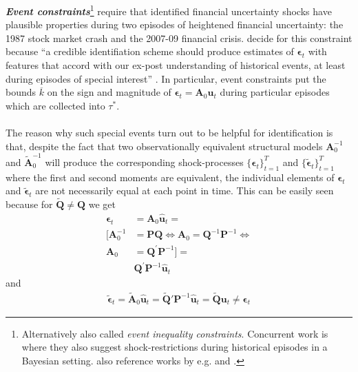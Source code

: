 \documentclass[a4paper,11pt,listof=nochaptergap,oneside,pointednumbers,bibtotoc,bigheadings,liststotoc,hidelinks]{scrbook}
\theoremstyle{mysatz}
\theoremstyle{mydefinition}
\theoremstyle{mytheorem}
\theoremstyle{mybemerkung}
\let\oldhat\hat
\newcommand{\vect}[1]{\boldsymbol{\mathbf{#1}}}
\newcommand{\hatt}[1]{\oldhat{\boldsymbol{\mathbf{#1}}}}
\begin{document}
\textbf{\textit{Event constraints}}\footnote{Alternatively also called \textit{event inequality constraints}. Concurrent work is \citet{diazramirez:18} where they also suggest shock-restrictions during historical episodes in a Bayesian setting. \citet{ludvigsonetal:17} also reference works by e.g. \citet{cieslakschrimpf:19} and \citet{zeev:18}.} require that identified financial uncertainty shocks have plausible properties during two episodes of heightened financial uncertainty: the 1987 stock market crash and the 2007-09 financial crisis. \citet{ludvigsonetal:18} decide for this constraint because ``a credible identifiation scheme should produce estimates of $\vect{\epsilon}_t$ with features that accord with our ex-post understanding of historical events, at least during episodes of special interest'' \citep[p. 7]{ludvigsonetal:18}.  In particular, event constraints put the bounds $\overline{k}$ on the sign and magnitude of $\vect{\epsilon}_t = \vect{A}_0\vect{u}_t$ during particular episodes which are collected into $\tau^*$. \\
\\
The reason why such special events turn out to be helpful for identification is that, despite the fact that two observationally equivalent structural models $\vect{A}_0^{-1}$ and $\widetilde{\vect{A}}_0^{-1}$ will produce the corresponding shock-processes $\big\{\vect{\epsilon}_t\big\}_{t=1}^T$ and $\big\{\widetilde{\vect{\epsilon}}_t\big\}_{t=1}^T$ where the first and second moments are equivalent, the individual elements of $\vect{\epsilon}_t$ and $\widetilde{\vect{\epsilon}}_t$ are not necessarily equal at each point in time. This can be easily seen because for $\widetilde{\vect{Q}} \neq \vect{Q}$ we get 
\begin{equation} \label{eq:svar_ludvi9}
\begin{split}
\vect{\epsilon}_t & = \vect{A}_0\hatt{\vect{u}}_t = \\
[\vect{A}_0^{-1} & = \vect{P}\vect{Q} \iff \vect{A}_0 = \vect{Q}^{-1}\vect{P}^{-1} \iff \\
\vect{A}_0 & = \vect{Q}^{'}\vect{P}^{-1}] = \\
	& \vect{Q}^'\vect{P}^{-1}\hatt{\vect{u}}_t 
\end{split}								
\end{equation}
and 
\begin{equation} \label{eq:svar_ludvi10}
\begin{split}
\widetilde{\vect{\epsilon}}_t = \widetilde{\vect{A}}_0\hatt{\vect{u}}_t = \widetilde{\vect{Q}}'\vect{P}^{-1}\hatt{\vect{u}}_t = \widetilde{\vect{Q}}\vect{u}_t \neq \vect{\epsilon}_t
\end{split}								
\end{equation}
\end{document}
